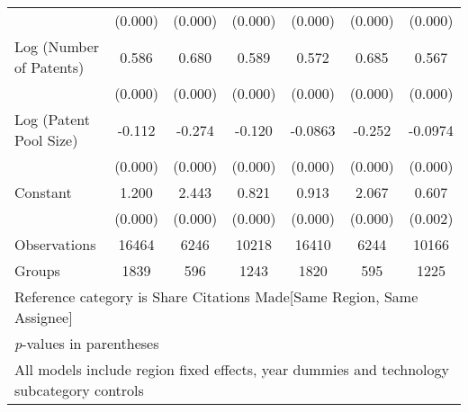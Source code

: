 \begin{table}[htbp]
\begin{adjustbox}{angle=90}
\begin{tabular}{l*{6}{c}}
                &  (0.000)&  (0.000)&  (0.000)&  (0.000)&  (0.000)&  (0.000)\\
Log (Number of Patents)&    0.586&    0.680&    0.589&    0.572&    0.685&    0.567\\
                &  (0.000)&  (0.000)&  (0.000)&  (0.000)&  (0.000)&  (0.000)\\
Log (Patent Pool Size)&   -0.112&   -0.274&   -0.120&  -0.0863&   -0.252&  -0.0974\\
                &  (0.000)&  (0.000)&  (0.000)&  (0.000)&  (0.000)&  (0.000)\\
Constant        &    1.200&    2.443&    0.821&    0.913&    2.067&    0.607\\
                &  (0.000)&  (0.000)&  (0.000)&  (0.000)&  (0.000)&  (0.002)\\
\hline
Observations    &    16464&     6246&    10218&    16410&     6244&    10166\\
Groups          &     1839&      596&     1243&     1820&      595&     1225\\
\hline\hline
\multicolumn{7}{l}{\footnotesize Reference category is Share Citations Made[Same Region, Same Assignee]}\\
\multicolumn{7}{l}{\footnotesize \textit{p}-values in parentheses}\\
\multicolumn{7}{l}{\footnotesize All models include region fixed effects, year dummies and technology subcategory controls}\\
\end{tabular}
\end{adjustbox}
\end{table}
